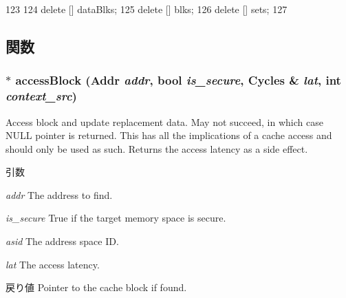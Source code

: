 \begin{DoxyCode}
123 {
124     delete [] dataBlks;
125     delete [] blks;
126     delete [] sets;
127 }
\end{DoxyCode}


\subsection{関数}
\hypertarget{classLRU_a969b41d68459011b652da68b4d5683a9}{
\subsubsection[{accessBlock}]{ $\ast$ accessBlock ({\bf Addr} {\em addr}, \/  bool {\em is\_\-secure}, \/  {\bf Cycles} \& {\em lat}, \/  int {\em context\_\-src})}}
\label{classLRU_a969b41d68459011b652da68b4d5683a9}
Access block and update replacement data. May not succeed, in which case NULL pointer is returned. This has all the implications of a cache access and should only be used as such. Returns the access latency as a side effect. 
\begin{DoxyParams}{引数}
\item[{\em addr}]The address to find. \item[{\em is\_\-secure}]True if the target memory space is secure. \item[{\em asid}]The address space ID. \item[{\em lat}]The access latency. \end{DoxyParams}
\begin{DoxyReturn}{戻り値}
Pointer to the cache block if found. 
\end{DoxyReturn}




